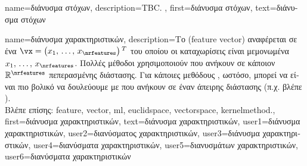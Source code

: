{name={\foreignlanguage{greek}{διάνυσμα στόχων}},
	description={TBC. },  
 	first={\foreignlanguage{greek}{διάνυσμα στόχων}}, 
 	text={\foreignlanguage{greek}{διάνυσμα στόχων}}
}%

{name={\foreignlanguage{greek}{διάνυσμα χαρακτηριστικών}},
	description={\foreignlanguage{greek}{Το}  
		 (feature vector) \foreignlanguage{greek}{αναφέρεται σε ένα}  
		$\vx = \big(x_{1}, \,\ldots, \,x_{\nrfeatures}\big)\,^{T}$ \foreignlanguage{greek}{του οποίου οι καταχωρίσεις είναι μεμονωμένα} 
		 $x_{1}, \,\ldots, \,x_{\nrfeatures}$. 
		\foreignlanguage{greek}{Πολλές μέθοδοι}  \foreignlanguage{greek}{χρησιμοποιούν}  
		 \foreignlanguage{greek}{που ανήκουν σε κάποιον}  $\mathbb{R}^{\nrfeatures}$
		\foreignlanguage{greek}{πεπερασμένης διάστασης. Για κάποιες μεθόδους} , \foreignlanguage{greek}{ωστόσο, 
		μπορεί να είναι πιο βολικό να δουλεύουμε με}   \foreignlanguage{greek}{που ανήκουν σε 
		έναν}  \foreignlanguage{greek}{άπειρης διάστασης (π.χ. βλέπε} ).
		\\
		\foreignlanguage{greek}{Βλέπε επίσης:} \gls{feature}, \gls{vector}, \gls{ml}, \gls{euclidspace}, \gls{vectorspace}, \gls{kernelmethod}.}, 
	first={\foreignlanguage{greek}{διάνυσμα χαρακτηριστικών}},
	text={\foreignlanguage{greek}{διάνυσμα χαρακτηριστικών}},
	user1={\foreignlanguage{greek}{διάνυσμα χαρακτηριστικών}}, %
  	user2={\foreignlanguage{greek}{διανύσματος χαρακτηριστικών}}, %
	user3={\foreignlanguage{greek}{διάνυσμα χαρακτηριστικών}}, %
	user4={\foreignlanguage{greek}{διανύσματα χαρακτηριστικών}}, %
  	user5={\foreignlanguage{greek}{διανυσμάτων χαρακτηριστικών}}, %
	user6={\foreignlanguage{greek}{διανύσματα χαρακτηριστικών}} %
}

